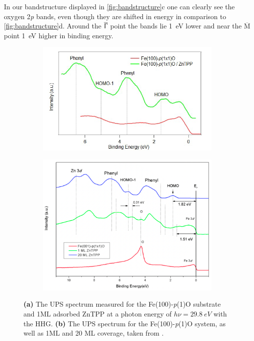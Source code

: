 In our bandstructure displayed in \autoref{fig:bandstructure}c one can clearly see the oxygen 2\textit{p} bands, even though they are shifted in energy in comparison to \autoref{fig:bandstructure}d. Around the $\overline{\Upgamma}$ point the bands lie \qty{1}{eV} lower and near the $\overline{\text{M}}$ point \qty{1}{eV} higher in binding energy.





\begin{figure}[h]
    \centering
    \begin{subfigure}{0.49\textwidth}
        \centering
        \includegraphics[width = \textwidth]{Plots/integrated_spectrum_Fe.png}
        \caption{}
        \label{fig:ups_spectrum}
    \end{subfigure}
    \hfill
    \begin{subfigure}{0.49\textwidth}
        \centering
        \includegraphics[width = \textwidth]{Plots/integrated_spectrum_Fe_lit.png}
        \caption{}
        \label{fig:ups_spectrum_lit}
    \end{subfigure}
    \caption{\textbf{(a)} The UPS spectrum measured for the Fe(100)-\textit{p}(1)O substrate and 1ML adsorbed ZnTPP at a photon energy of $h\nu = \qty{29.8}{eV}$ with the HHG. \textbf{(b)} The UPS spectrum for the Fe(100)-\textit{p}(1)O system, as well as 1ML and 20 ML coverage, taken from \cite*{tesi}.}
    \label{fig:ups}
\end{figure}

